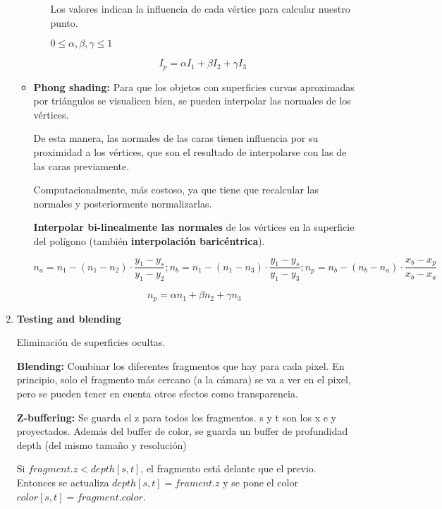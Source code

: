 \begin{enumerate}
\begin{itemize}
\begin{itemize}
			                  Los valores indican la influencia de cada vértice para calcular nuestro punto. 
			                  
			                  $0\leq \alpha, \beta, \gamma \leq 1$
			                  
			                  $$I_p=\alpha I_1 + \beta I_2 + \gamma I_3$$
		            \end{itemize}
		      \item \textbf{Phong shading:} Para que los objetos con superficies curvas aproximadas por triángulos se visualicen bien, se pueden interpolar las normales de los vértices.
		            
		            De esta manera, las normales de las caras tienen influencia por su proximidad a los vértices, que son el resultado de interpolarse con las de las caras previamente.
		            
		            Computacionalmente, más costoso, ya que tiene que recalcular las normales y posteriormente normalizarlas.
		            
		            \textbf{Interpolar bi-linealmente las normales} de los vértices en la superficie del polígono (también \textbf{interpolación baricéntrica}).
		            
		            $$n_a =  n_1 - (n_1 - n_2) \cdot \frac{y_1-y_s}{y_1 - y_2};
			            n_b =  n_1 - (n_1 - n_3) \cdot \frac{y_1-y_s}{y_1 - y_3};
			            n_p =  n_b - (n_b - n_a) \cdot \frac{x_b - x_p}{x_b-x_a}$$
		            
		            $$n_p=\alpha n_1 + \beta n_2 + \gamma n_3$$
	      \end{itemize}
	      
	      
	\item \textbf{Testing and blending}
	      
	      Eliminación de superficies ocultas.
	      
	      \textbf{Blending:} Combinar los diferentes fragmentos que hay para cada pixel. En principio, solo el fragmento más cercano (a la cámara) se va a ver en el pixel, pero se pueden tener en cuenta otros efectos como transparencia.
	      
	      \textbf{Z-buffering:} Se guarda el z para todos los fragmentos. s y t son los x e y proyectados. Además del buffer de color, se guarda un buffer de profundidad depth (del mismo tamaño y resolución)
	      
	      Si $fragment.z < depth[s,t]$, el fragmento está delante que el previo. Entonces se actualiza $depth[s,t] = frament.z$ y se pone el color $color[s,t] = fragment.color$.
\end{enumerate}

